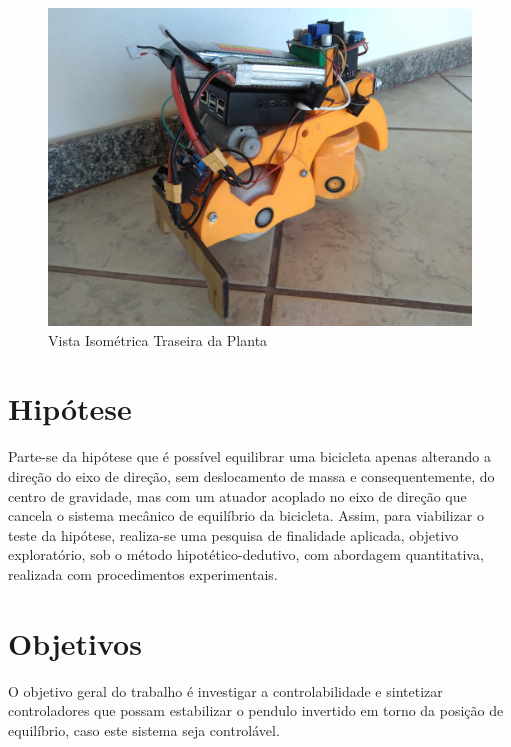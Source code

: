         \begin{figure}[!htb] 
            \centering
            \includegraphics[width=13cm]{Imagens/MotinhaIsometricaTraseira.jpg}{
                \small
                \centering
                \caption{Vista Isométrica Traseira da Planta}
                \label{fig:motinha2}}
        \end{figure}
		
	\section{Hipótese}
	    Parte-se da hipótese que é possível equilibrar uma bicicleta apenas alterando a direção do eixo de direção, sem deslocamento de massa e consequentemente, do centro de gravidade, mas com um atuador acoplado no eixo de direção que cancela o sistema mecânico de equilíbrio da bicicleta. Assim, para viabilizar o teste da hipótese, realiza-se uma pesquisa de finalidade aplicada, objetivo exploratório, sob o método hipotético-dedutivo, com abordagem quantitativa, realizada com procedimentos experimentais. %
        
    \section{Objetivos} %
        
        O objetivo geral do trabalho é investigar a controlabilidade e sintetizar controladores que possam estabilizar o pendulo invertido em torno da posição de equilíbrio, caso este sistema seja controlável. 
		
